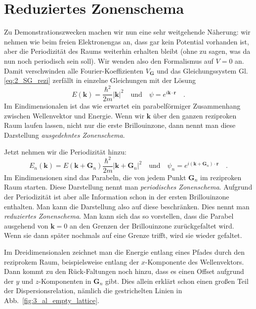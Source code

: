 \section{Reduziertes Zonenschema}

Zu Demonstrationszwecken machen wir nun eine sehr weitgehende Näherung: wir nehmen wie beim freien Elektronengas an, dass gar kein Potential vorhanden ist, aber die Periodizität des Raums weiterhin erhalten bleibt (ohne zu sagen, was da nun noch periodisch sein soll). Wir wenden also den Formalismus auf $V=0$ an. Damit verschwinden alle Fourier-Koeffizienten $V_\mathbf{G}$ und das Gleichungssystem Gl. \ref{eq:2_SG_rezi} zerfällt in einzelne Gleichungen mit der Lösung
\begin{equation}
    E(\mathbf{k}) = \frac{\hbar^2}{2m} \left| \mathbf{k}  \right|^2 
    \quad \text{und} \quad 
    \psi = e^{i \mathbf{k} \cdot \mathbf{r}} \quad .
\end{equation}
Im Eindimensionalen ist das  wie erwartet ein parabelförmiger Zusammenhang zwischen Wellenvektor und Energie. Wenn wir $\mathbf{k}$ über den ganzen reziproken Raum laufen lassen, nicht nur die erste Brillouinzone, dann nennt man diese Darstellung \emph{ausgedehntes Zonenschema}.

Jetzt nehmen wir die Periodizität hinzu:
\begin{equation}
    E_n(\mathbf{k}) = E(\mathbf{k} + \mathbf{G}_n) \frac{\hbar^2}{2m} \left| \mathbf{k} + \mathbf{G}_n \right|^2 \quad \text{und} \quad \psi_n = e^{i (\mathbf{k} + \mathbf{G}_n) \cdot \mathbf{r}} \quad .
\end{equation}
Im Eindimensionen sind das Parabeln, die von jedem Punkt  $\mathbf{G}_n $ im reziproken Raum starten. Diese Darstellung nennt man \emph{periodisches Zonenschema}. Aufgrund der Periodizität ist aber alle Information schon in der ersten Brillouinzone enthalten. Man kann die Darstellung also auf diese beschränken. Dies nennt man  \emph{reduziertes Zonenschema}. Man kann sich das so vorstellen, dass die Parabel ausgehend von  $\mathbf{k} = 0$  an den Grenzen der Brillouinzone zurückgefaltet wird. Wenn sie dann später nochmals auf eine Grenze trifft, wird sie wieder gefaltet.


Im Dreidimensionalen zeichnet man die Energie entlang eines Pfades durch den reziprokem Raum, beispielsweise entlang der $x$-Komponente des Wellenvektors. Dann 
kommt zu den Rück-Faltungen noch hinzu, dass es einen Offset aufgrund der $y$ und $z$-Komponenten in $\mathbf{G}_n $ gibt. Dies allein erklärt schon einen großen Teil der Dispersionsrelation, nämlich die gestrichelten Linien in Abb.~\ref{fig:3_al_empty_lattice}.

